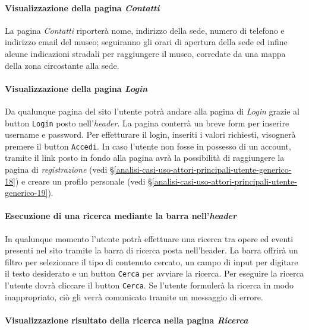 \paragraph{Visualizzazione della pagina \textit{Contatti}}
\label{analisi-casi-uso-attori-principali-utente-generico-10}
La pagina \textit{Contatti} riporterà nome, indirizzo della sede, numero di telefono e indirizzo email del museo; seguiranno gli orari di apertura della sede ed infine alcune indicazioni stradali per raggiungere il museo, corredate da una mappa della zona circostante alla sede.

\paragraph{Visualizzazione della pagina \textit{Login}}
\label{analisi-casi-uso-attori-principali-utente-generico-11}
Da qualunque pagina del sito l'utente potrà andare alla pagina di \textit{Login} grazie al button \texttt{Login} posto nell'\textit{header}. La pagina conterrà un breve form per inserire username e password. Per effetturare il login, inseriti i valori richiesti, visognerà premere il button \texttt{Accedi}. In caso l'utente non fosse in possesso di un account, tramite il link posto in fondo alla pagina avrà la possibilità di raggiungere la pagina di \textit{registrazione} (vedi §\ref{analisi-casi-uso-attori-principali-utente-generico-18}) e creare un profilo personale (vedi §\ref{analisi-casi-uso-attori-principali-utente-generico-19}).

\paragraph{Esecuzione di una ricerca mediante la barra nell'\textit{header}}
\label{analisi-casi-uso-attori-principali-utente-generico-12}
In qualunque momento l'utente potrà effettuare una ricerca tra opere ed eventi presenti nel sito tramite la barra di ricerca posta nell'header. La barra offrirà un filtro per selezionare il tipo di contenuto cercato, un campo di input per digitare il testo desiderato e un button \texttt{Cerca} per avviare la ricerca. Per eseguire la ricerca l'utente dovrà cliccare il button \texttt{Cerca}. Se l'utente formulerà la ricerca in modo inappropriato, ciò gli verrà comunicato tramite un messaggio di errore.

\paragraph{Visualizzazione risultato della ricerca nella pagina \textit{Ricerca}}
\label{analisi-casi-uso-attori-principali-utente-generico-13}

